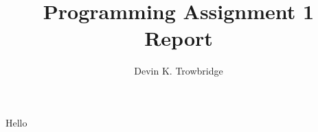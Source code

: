 \documentclass[a4paper,10pt]{article}
\title{Programming Assignment 1 Report}
\author{Devin K. Trowbridge}
\begin{document}
\maketitle
Hello
\end{document}
